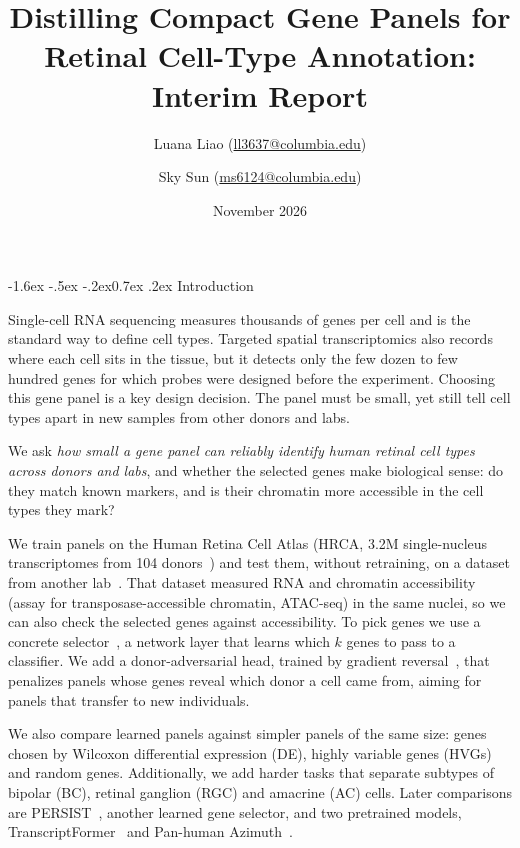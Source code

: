 \documentclass[11pt]{article}
\title{\Large\bfseries Distilling Compact Gene Panels for Retinal Cell-Type Annotation:\\ Interim Report}
\author{Luana Liao (\href{mailto:ll3637@columbia.edu}{ll3637@columbia.edu}) \and
        Sky Sun (\href{mailto:ms6124@columbia.edu}{ms6124@columbia.edu})}
\date{November 2026}
\makeatletter
\renewcommand\section{\@startsection{section}{1}{\z@}%
    {-1.6ex \@plus -.5ex \@minus -.2ex}{0.7ex \@plus .2ex}%
    {\normalfont\large\bfseries}}
\makeatother
\begin{document}
\maketitle
\vspace{-1.5em}

\section{Introduction}

Single-cell RNA sequencing measures thousands of genes per cell and is the standard way to
define cell types. Targeted spatial transcriptomics also records where each cell sits in the
tissue, but it detects only the few dozen to few hundred genes for which probes were
designed before the experiment. Choosing this gene panel is a key design decision. The panel
must be small, yet still tell cell types apart in new samples from other donors and labs.

We ask \emph{how small a gene panel can reliably identify human retinal cell types across
donors and labs}, and whether the selected genes make biological sense: do they match known
markers, and is their chromatin more accessible in the cell types they mark?

We train panels on the Human Retina Cell Atlas (HRCA, 3.2M single-nucleus transcriptomes
from 104 donors~\cite{li2026}) and test them, without retraining, on a dataset from another
lab~\cite{wang2022}. That dataset measured RNA and chromatin accessibility (assay for
transposase-accessible chromatin, ATAC-seq) in the same nuclei, so we can also check the
selected genes against accessibility. To pick genes we use a concrete
selector~\cite{abid2019,jang2017}, a network layer that learns which $k$ genes to pass to a
classifier. We add a donor-adversarial head, trained by gradient reversal~\cite{ganin2016},
that penalizes panels whose genes reveal which donor a cell came from, aiming for panels that
transfer to new individuals.

We also compare learned panels against simpler panels of the
same size: genes chosen by Wilcoxon differential expression (DE), highly variable genes
(HVGs) and random genes. Additionally, we add harder tasks that separate subtypes of bipolar (BC),
retinal ganglion (RGC) and amacrine (AC) cells. Later comparisons are PERSIST~\cite{covert2023},
another learned gene selector, and two pretrained models, TranscriptFormer~\cite{pearce2025}
and Pan-human Azimuth~\cite{azimuth2026}.
\end{document}
